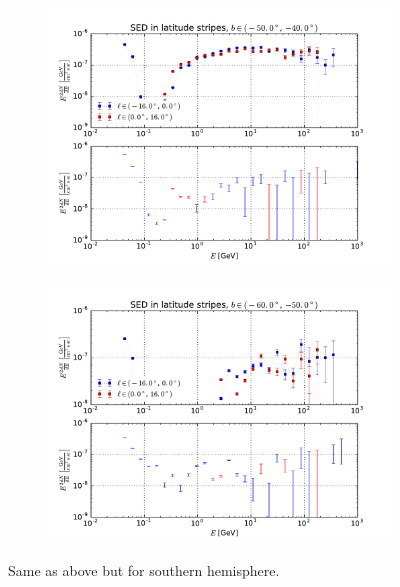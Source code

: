 \documentclass[a4paper]{article}
\begin{document}
\begin{figure}
\begin{subfigure}{0.5\textwidth}
        \includegraphics[width=\textwidth]{spectrum_of_bottom_bubble_in_lat_stripes_40-50.pdf}
    \end{subfigure} 
    \begin{subfigure}{0.5\textwidth}
        \includegraphics[width=\textwidth]{spectrum_of_bottom_bubble_in_lat_stripes_50-60.pdf}
    \end{subfigure}
    \caption{Same as above but for southern hemisphere.}
\end{figure}
\end{document}
